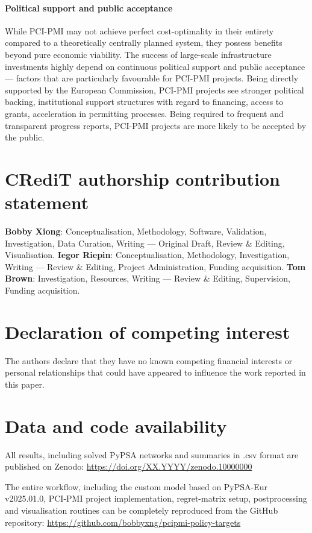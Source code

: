 \documentclass[preprint,12pt,sort&compress]{elsarticle}
\begin{document}
\paragraph{Political support and public acceptance} 
While PCI-PMI may not achieve perfect cost-optimality in their entirety compared to a theoretically centrally planned system, they possess benefits beyond pure economic viability. The success of large-scale infrastructure investments highly depend on continuous political support and public acceptance --- factors that are particularly favourable for PCI-PMI projects. Being directly supported by the European Commission, PCI-PMI projects see stronger political backing, institutional support structures with regard to financing, access to grants, acceleration in permitting processes. Being required to frequent and transparent progress reports, PCI-PMI projects are more likely to be accepted by the public.


\clearpage
\section*{CRediT authorship contribution statement}
\textbf{Bobby Xiong}: Conceptualisation, Methodology, Software, Validation, Investigation, Data Curation, Writing --- Original Draft, Review \& Editing, Visualisation. \textbf{Iegor Riepin}: Conceptualisation, Methodology, Investigation, Writing --- Review \& Editing, Project Administration, Funding acquisition. \textbf{Tom Brown}: Investigation, Resources, Writing --- Review \& Editing, Supervision, Funding acquisition.

\section*{Declaration of competing interest}
The authors declare that they have no known competing financial interests or personal relationships that could have appeared to influence the work reported in this paper.

\section*{Data and code availability}
All results, including solved PyPSA networks and summaries in .csv format are published on Zenodo: \newline
\href{https://doi.org/XX.YYYY/zenodo.10000000}{https://doi.org/XX.YYYY/zenodo.10000000}

The entire workflow, including the custom model based on PyPSA-Eur v2025.01.0, PCI-PMI project implementation, regret-matrix setup, postprocessing and visualisation routines can be completely reproduced from the GitHub repository: \newline 
\href{https://github.com/bobbyxng/pcipmi-policy-targets}{https://github.com/bobbyxng/pcipmi-policy-targets}
\end{document}
